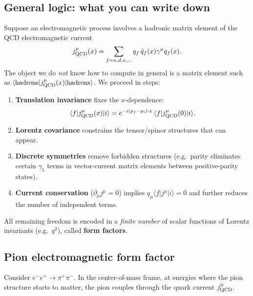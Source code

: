 \subsection{General logic: what you can write down}
Suppose an electromagnetic process involves a hadronic matrix element of the QCD
electromagnetic current
\begin{equation}
j^\mu_{\rm QCD}(x)=\sum_{f=u,d,s,\dots} q_f\,\bar q_f(x)\gamma^\mu q_f(x).
\end{equation}
The object we do \emph{not} know how to compute in general is a matrix element such as
$\langle {\rm hadrons} | j^\mu_{\rm QCD}(x) | {\rm hadrons} \rangle$.
We proceed in steps:

\begin{enumerate}
  \item \textbf{Translation invariance} fixes the $x$-dependence:
  \[
  \langle f|j^\mu_{\rm QCD}(x)|i\rangle
  = e^{-i(p_f-p_i)\cdot x}\,\langle f|j^\mu_{\rm QCD}(0)|i\rangle .
  \]
  \item \textbf{Lorentz covariance} constrains the tensor/spinor structures that can appear.
  \item \textbf{Discrete symmetries} remove forbidden structures (e.g.\ parity eliminates certain $\gamma_5$ terms in vector-current matrix elements between positive-parity states).
  \item \textbf{Current conservation} ($\partial_\mu j^\mu=0$) implies $q_\mu \langle f|j^\mu|i\rangle=0$ and further reduces the number of independent terms.
\end{enumerate}

All remaining freedom is encoded in a \emph{finite number} of scalar functions of
Lorentz invariants (e.g.\ $q^2$), called \textbf{form factors}.

\subsection{Pion electromagnetic form factor}
Consider $e^-e^+\to \pi^+\pi^-$. In the center-of-mass frame, at energies where the pion
structure starts to matter, the pion couples through the quark current $j^\mu_{\rm QCD}$.

